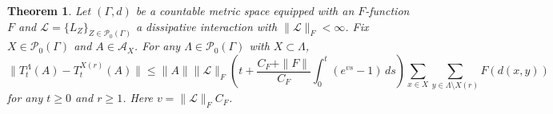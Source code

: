 \documentclass{article}
\newcommand{\<}{\langle}
\renewcommand{\>}{\rangle}
\numberwithin{equation}{section}
\newtheorem{thm}{Theorem}[section]
\theoremstyle{definition}
\begin{document}
    \begin{thm}\label{thm:gen_sl_app}
    Let $(\Gamma, d)$ be a countable metric space equipped with an $F$-function $F$ and $\mathscr{L}= \{ L_Z \}_{Z \in \mathcal{P}_0(\Gamma)}$ a dissipative interaction with $\| \mathscr{L} \|_F< \infty$. Fix $X \in \mathcal{P}_0(\Gamma)$ and $A \in \mathcal{A}_X$. For any $\Lambda \in \mathcal{P}_0(\Gamma)$ with $X \subset \Lambda$, 
   \begin{equation}\label{localize}
            \|T^\Lambda_t(A) - T^{X(r)}_t(A)\| \le \|A\| \| \mathscr{L}\|_{F} \left(t + \frac{C_{F} + \| F \|}{C_{F}} \int_0^t (e^{vs} -1) \, ds \right) \sum_{x \in X} \sum_{y \in \Lambda \setminus X(r)} F(d(x,y)) 
            \end{equation}   
    for any $t \geq 0$ and $r \geq 1$. Here $v = \| \mathscr{L} \|_F C_F$. 
    \end{thm}
\end{document}
